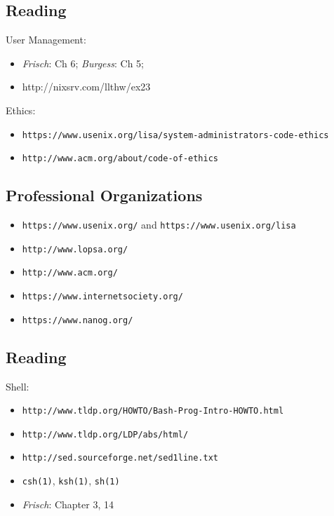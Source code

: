 \documentclass[xga]{xdvislides}
\begin{document}
\subsection{Reading}
User Management:
\begin{itemize}
	\item {\em Frisch}: Ch 6; {\em Burgess}: Ch 5;
\end{itemize}
\vspace{.5in}
\begin{itemize}
	\item http://nixsrv.com/llthw/ex23
\end{itemize}
\vspace{.5in}
Ethics:
\begin{itemize}
	\item \verb+https://www.usenix.org/lisa/system-administrators-code-ethics+
	\item \verb+http://www.acm.org/about/code-of-ethics+
\end{itemize}

\subsection{Professional Organizations}
\begin{itemize}
	\item \verb+https://www.usenix.org/+ and \verb+https://www.usenix.org/lisa+
	\item \verb+http://www.lopsa.org/+
	\item \verb+http://www.acm.org/+
	\item \verb+https://www.internetsociety.org/+
	\item \verb+https://www.nanog.org/+
\end{itemize}

\subsection{Reading}
Shell:
\begin{itemize}
	\item \verb+http://www.tldp.org/HOWTO/Bash-Prog-Intro-HOWTO.html+
	\item \verb+http://www.tldp.org/LDP/abs/html/+
	\item \verb+http://sed.sourceforge.net/sed1line.txt+
	\item \verb+csh(1)+, \verb+ksh(1)+, \verb+sh(1)+
	\item {\em Frisch}: Chapter 3, 14
\end{itemize}
%
\end{document}
